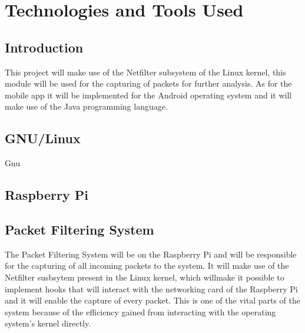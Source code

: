 \chapter{Technologies and Tools Used}
\label{chap:tech}


\section{Introduction}
\label{chap3:sec:intro}
This project will make use of the Netfilter subsystem of the Linux kernel, this
module will be used for the capturing of packets for further analysis. As for
the mobile app it will be implemented for the Android operating system and it
will make use of the Java programming language.

\section{GNU/Linux}
\label{chap3:sec:gnux}
Gnu

\section{Raspberry Pi}
\label{chap3:sec:rasp}

\section{Packet Filtering System}
\label{chap3:sec:pfs}
The Packet Filtering System will be on the Raspberry Pi and will be responsible
for the capturing of all incoming packets to the system. It will make use of
the Netfilter susbsytem present in the Linux kernel, which willmake it possible
to implement hooks that will interact with the networking card of the Raspberry
Pi and it will enable the capture of every packet. This is one of the vital
parts of the system because of the efficiency gained from interacting with the
operating system's kernel directly.

